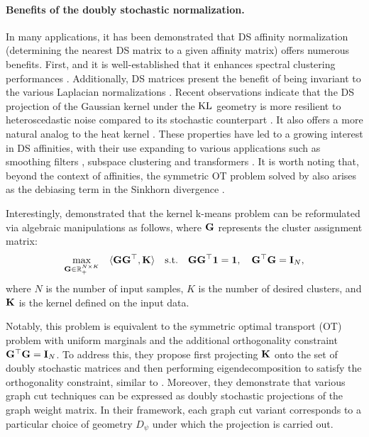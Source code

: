 \paragraph{Benefits of the doubly stochastic normalization.}
In many applications, it has been demonstrated that DS affinity normalization (\ie determining the nearest DS matrix to a given affinity matrix) offers numerous benefits. First, and it is well-established that it enhances spectral clustering performances \citep{Ding_understand,Zass,beauchemin2015affinity}. Additionally, DS matrices present the benefit of being invariant to the various Laplacian normalizations \citep{von2007tutorial}. Recent observations indicate that the DS projection of the Gaussian kernel under the $\operatorname{KL}$ geometry is more resilient to heteroscedastic noise compared to its stochastic counterpart \citep{landa2021doubly}. It also offers a more natural analog to the heat kernel \citep{marshall2019manifold}.
These properties have led to a growing interest in DS affinities, with their use expanding to various applications such as smoothing filters \citep{Milanfar}, subspace clustering \citep{lim2020doubly} and transformers \citep{sander2022sinkformers}. It is worth noting that, beyond the context of affinities, the symmetric OT problem solved by  also arises as the debiasing term in the Sinkhorn divergence \citep{feydy2019interpolating}.


\begin{remark}
    Interestingly, \citet{zass2005unifying} demonstrated that the kernel k-means problem can be reformulated via algebraic manipulations as follows, where ${\mathbf{G}}$ represents the cluster assignment matrix:
    \[
        \max_{{\mathbf{G}} \in \mathbb{R}^{N \times K}_+} \quad \langle {\mathbf{G}} {\mathbf{G}}^\top, {\mathbf{K}} \rangle \quad \text{s.t.} \quad {\mathbf{G}} {\mathbf{G}}^\top \mathbf{1} = \mathbf{1}, \quad {\mathbf{G}}^\top {\mathbf{G}} = {\mathbf{I}}_N,
    \]
    where $N$ is the number of input samples, $K$ is the number of desired clusters, and ${\mathbf{K}}$ is the kernel defined on the input data. 

    Notably, this problem is equivalent to the symmetric optimal transport (OT) problem with uniform marginals and the additional orthogonality constraint ${\mathbf{G}}^\top {\mathbf{G}} = {\mathbf{I}}_N$. To address this, they propose first projecting ${\mathbf{K}}$ onto the set of doubly stochastic matrices and then performing eigendecomposition to satisfy the orthogonality constraint, similar to . Moreover, they demonstrate that various graph cut techniques can be expressed as doubly stochastic projections of the graph weight matrix. In their framework, each graph cut variant corresponds to a particular choice of geometry $D_\psi$ under which the projection is carried out.
\end{remark}


